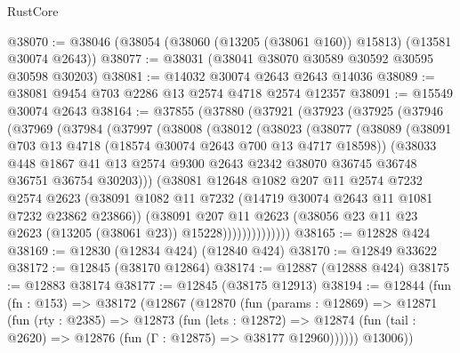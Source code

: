 \begin{lexlean}{RustCore}
\begin{coremodule}
@38070 := @38046 (@38054 (@38060 (@13205 (@38061 @160)) @15813) (@13581 @30074 @2643))
@38077 := @38031 (@38041 @38070 @30589 @30592 @30595 @30598 @30203)
@38081 := @14032 @30074 @2643 @2643 @14036
@38089 := @38081 @9454 @703 @2286 @13 @2574 @4718 @2574 @12357
@38091 := @15549 @30074 @2643
@38164 := @37855
    (@37880
      (@37921
        (@37923
          (@37925
            (@37946
              (@37969
                (@37984
                  (@37997
                    (@38008
                      (@38012
                        (@38023
                          (@38077
                            (@38089
                              (@38091 @703 @13 @4718 (@18574 @30074 @2643 @700 @13 @4717 @18598))
                              (@38033
                                @448
                                @1867
                                @41
                                @13
                                @2574
                                @9300
                                @2643
                                @2342
                                @38070
                                @36745
                                @36748
                                @36751
                                @36754
                                @30203)))
                          (@38081
                            @12648
                            @1082
                            @207
                            @11
                            @2574
                            @7232
                            @2574
                            @2623
                            (@38091
                              @1082
                              @11
                              @7232
                              (@14719 @30074 @2643 @11 @1081 @7232 @23862 @23866))
                            (@38091
                              @207
                              @11
                              @2623
                              (@38056 @23 @11 @23 @2623 (@13205 (@38061 @23)) @15228))))))))))))))
@38165 := @12828 @424
@38169 := @12830 (@12834 @424) (@12840 @424)
@38170 := @12849 @33622
@38172 := @12845 (@38170 @12864)
@38174 := @12887 (@12888 @424)
@38175 := @12883 @38174
@38177 := @12845 (@38175 @12913)
@38194 := @12844
    (fun (fn : @153) =>
    @38172
      (@12867
        (@12870
          (fun (params : @12869) =>
          @12871
            (fun (rty : @2385) =>
            @12873
              (fun (lets : @12872) =>
              @12874 (fun (tail : @2620) => @12876 (fun (Γ : @12875) => @38177 @12960))))))
        @13006))

\end{coremodule}
\end{lexlean}
